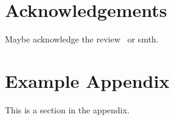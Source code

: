 \documentclass[11pt]{article}
\begin{document}
\section*{Acknowledgements}
Maybe acknowledge the review~\cite{srl-review} or smth.




\appendix

\section{Example Appendix}\label{sec:appendix}

This is a section in the appendix.
\end{document}

